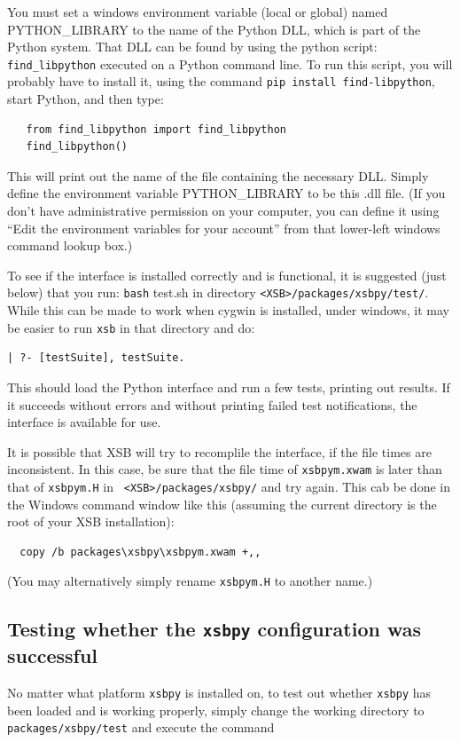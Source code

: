 You must set a windows environment variable (local or global) named
PYTHON\_LIBRARY to the name of the Python DLL, which is part of the
Python system.  That DLL can be found by using the python script:
{\tt find\_libpython} executed on a Python command line.  To run this
script, you will probably have to install it, using the command
{\tt pip install find-libpython}, start Python, and then type:
\begin{verbatim}
   from find_libpython import find_libpython
   find_libpython()
\end{verbatim}
This will print out the name of
the file containing the necessary DLL.  Simply define the environment
variable PYTHON\_LIBRARY to be this .dll file.  (If you don't have
administrative permission on your computer, you can define it using
``Edit the environment variables for your account'' from that
lower-left windows command lookup box.)

To see if the interface is installed correctly and is functional, it
is suggested (just below) that you run: {\tt bash} test.sh in
directory {\tt <XSB>/packages/xsbpy/test/}.  While this can be made to
work when cygwin is installed, under windows, it may be easier to run
{\tt xsb} in that directory and do:
\begin{verbatim}
| ?- [testSuite], testSuite.
\end{verbatim}
This should load the Python interface and run a few tests, printing
out results.  If it succeeds without errors and without printing
failed test notifications, the interface is available for use.

It is possible that XSB will try to recomplile the interface, if the
file times are inconsistent.  In this case, be sure that the file time
of {\tt xsbpym.xwam} is later than that of {\tt xsbpym.H} in {\tt
  <XSB>/packages/xsbpy/} and try again.
This cab be done in the Windows command window like this (assuming
the current directory is the root of your XSB installation):
\begin{verbatim}
  copy /b packages\xsbpy\xsbpym.xwam +,,
\end{verbatim}
(You may alternatively simply
rename {\tt xsbpym.H} to another name.)

\subsection{Testing whether the {\tt xsbpy} configuration was successful}

No matter what platform {\tt xsbpy} is installed on, to test out
whether {\tt xsbpy} has been loaded and is working properly, simply
change the working directory to {\tt packages/xsbpy/test} and execute the
command

